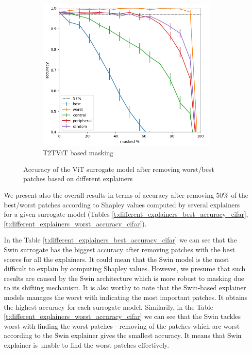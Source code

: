 \documentclass[magisterska,en]{pracamgr}
\begin{document}
\begin{figure}
\begin{subfigure}{.5\textwidth}
  \centering
  \includegraphics[width=1\linewidth]{./images/v_on_v_metrics.png}
  \caption{T2T\textunderscore ViT based masking }
\end{subfigure}


\caption{Accuracy of the ViT surrogate model after removing worst/best patches based on different explainers}
\label{fig:Different explainers metrics}
\end{figure}



We present also the overall results in terms of accuracy after removing 50\% of the best/worst patches according to Shapley values computed by several explainers for a given surrogate model (Tables \ref{t:different_explainers_best_accuracy_cifar}, \ref{t:different_explainers_worst_accuracy_cifar}). 

In the Table  \ref{t:different_explainers_best_accuracy_cifar} we can see that the Swin surrogate has the biggest accuracy after removing patches with the best scores for all the explainers. It could mean that the Swin model is the most difficult to explain by computing Shapley values. However, we presume that such results are caused by the Swin architecture which is more robust to masking due to its shifting mechanism. It is also worthy to note that the Swin-based explainer models manages the worst with indicating the most important patches. It obtains the highest accuracy for each surrogate model. Similarily, in the Table  \ref{t:different_explainers_worst_accuracy_cifar} we can see that the Swin tackles worst with finding the worst patches - removing of the patches which are worst according to the Swin explainer gives the smallest accuracy. It means that Swin explainer is unable to find the worst patches effectively.
\end{document}

